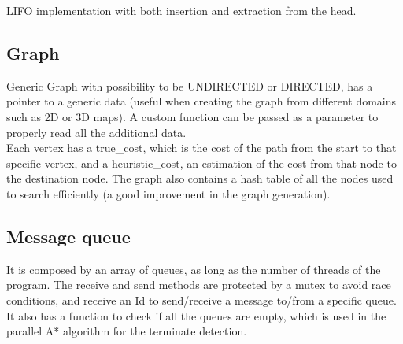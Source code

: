 LIFO implementation with both insertion and extraction from the head.

\subsection{Graph}

Generic Graph with possibility to be UNDIRECTED or DIRECTED, has a pointer to a generic data (useful when creating the graph from different domains such as 2D or 3D maps). A custom function can be passed as a parameter to properly read all the additional data. \\
Each vertex has a true\_cost, which is the cost of the path from the start to that specific vertex, and a heuristic\_cost, an estimation of the cost from that node to the destination node.
The graph also contains a hash table of all the nodes used to search efficiently (a good improvement in the graph generation).

\subsection{Message queue}
\label{message_queue}

It is composed by an array of queues, as long as the number of threads of the program.
The receive and send methods are protected by a mutex to avoid race conditions, and receive an Id to send/receive a message to/from a specific queue. 
It also has a function to check if all the queues are empty, which is used in the parallel A* algorithm for the terminate detection.
